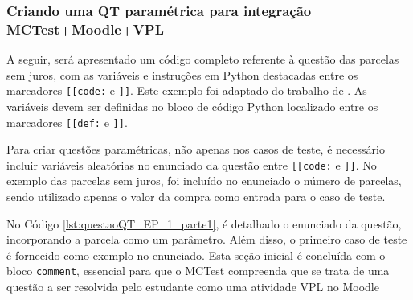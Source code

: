\subsubsection{Criando uma QT paramétrica para integração MCTest+Moodle+VPL}

A seguir, será apresentado um código completo referente à questão das parcelas sem juros, com as variáveis e instruções em Python destacadas entre os marcadores \verb|[[code:| e \verb|]]|. Este exemplo foi adaptado do trabalho de . As variáveis devem ser definidas no bloco de código Python localizado entre os marcadores \verb|[[def:| e \verb|]]|.

Para criar questões paramétricas, não apenas nos casos de teste, é necessário incluir variáveis aleatórias no enunciado da questão entre \verb|[[code:| e \verb|]]|. No exemplo das parcelas sem juros, foi incluído no enunciado o número de parcelas, sendo utilizado apenas o valor da compra como entrada para o caso de teste.



No Código \ref{lst:questaoQT_EP_1_parte1}, é detalhado o enunciado da questão, incorporando a parcela como um parâmetro. Além disso, o primeiro caso de teste é fornecido como exemplo no enunciado. Esta seção inicial é concluída com o bloco \verb|comment|, essencial para que o MCTest compreenda que se trata de uma questão a ser resolvida pelo estudante como uma atividade VPL no Moodle


